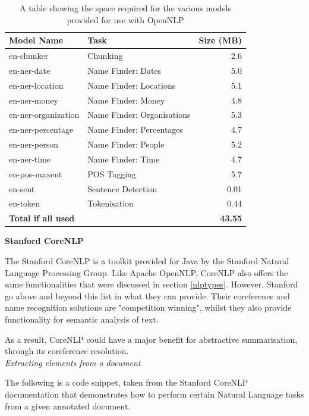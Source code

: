 \documentclass[12pt]{article}
\begin{document}
\begin{table}[H]
	\centering
	\begin{tabular}{l|l|r}
		\textbf{Model Name} & \textbf{Task} & \textbf{Size (MB)} \\ \hline
		en-chunker & Chunking & 2.6 \\ \hline
		en-ner-date & Name Finder: Dates & 5.0 \\ \hline
		en-ner-location & Name Finder: Locations & 5.1 \\ \hline
		en-ner-money & Name Finder: Money & 4.8 \\ \hline
		en-ner-organization & Name Finder: Organisations & 5.3 \\ \hline
		en-ner-percentage & Name Finder: Percentages & 4.7 \\ \hline
		en-ner-person & Name Finder: People & 5.2 \\ \hline
		en-ner-time & Name Finder: Time & 4.7 \\ \hline
		en-pos-maxent & POS Tagging & 5.7 \\ \hline
		en-sent & Sentence Detection & 0.01 \\ \hline
		en-token & Tokenisation & 0.44 \\ \hline
		\textbf{Total if all used} & & \textbf{43.55} \\ \hline
	\end{tabular}
	\caption[Space used for OpenNLP models]{A table showing the space required for the various models provided for use with OpenNLP}
	\label{opennlpspace}
\end{table}

\textbf{Stanford CoreNLP}

The Stanford CoreNLP is a toolkit provided for Java by the Stanford Natural Language Processing Group. Like Apache OpenNLP, CoreNLP also offers the same functionalities that were discussed in section \ref{nlptypes}. However, Stanford go above and beyond this list in what they can provide. Their coreference and name recognition solutions are "competition winning", whilst they also provide functionality for semantic analysis of text.

As a result, CoreNLP could have a major benefit for abstractive summarisation, through its coreference resolution. \\

\emph{Extracting elements from a document}

The following is a code snippet, taken from the Stanford CoreNLP documentation that demonstrates how to perform certain Natural Language tasks from a given annotated document. \\
\end{document}
